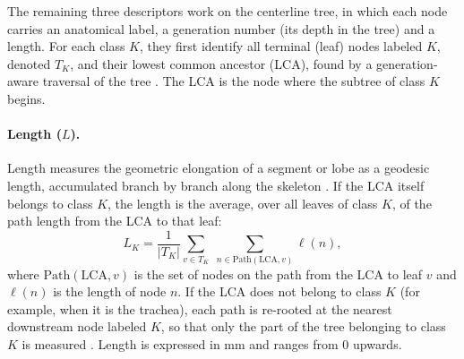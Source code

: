 The remaining three descriptors work on the centerline tree, in which each node carries an
anatomical label, a generation number (its depth in the tree) and a length. For each class
$K$, they first identify all terminal (leaf) nodes labeled $K$, denoted $T_K$, and their
lowest common ancestor (LCA), found by a generation-aware traversal of the
tree \cite{zhang2025airmorph}. The LCA is the node where the subtree of class $K$ begins.

\paragraph{Length ($L$).}                %
Length measures the geometric elongation of a segment or lobe as a geodesic length,
accumulated branch by branch along the skeleton \cite{zhang2025airmorph}. If the LCA itself
belongs to class $K$, the length is the average, over all leaves of class $K$, of the path
length from the LCA to that leaf:
\begin{equation}
  L_K = \frac{1}{|T_K|} \sum_{v \in T_K} \;\sum_{n \in \mathrm{Path}(\mathrm{LCA}, v)}
  \ell(n),
  \label{eq:morph_length}                %
\end{equation}
where $\mathrm{Path}(\mathrm{LCA}, v)$ is the set of nodes on the path from the LCA to leaf
$v$ and $\ell(n)$ is the length of node $n$. If the LCA does not belong to class $K$ (for
example, when it is the trachea), each path is re-rooted at the nearest downstream node
labeled $K$, so that only the part of the tree belonging to class $K$ is
measured \cite{zhang2025airmorph}. Length is expressed in mm and ranges from 0 upwards.


